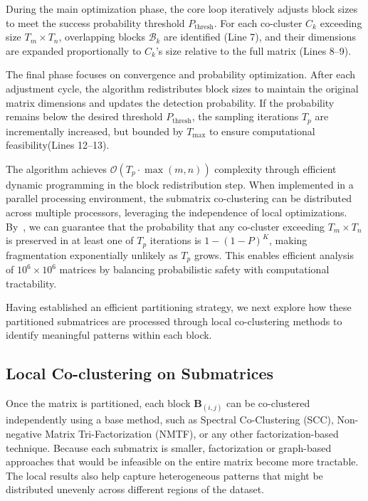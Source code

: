 \documentclass[journal]{IEEEtran}
\begin{document}
During the main optimization phase, the core loop iteratively adjusts block sizes to meet the success probability threshold $P_{\text{thresh}}$. For each co-cluster $C_k$ exceeding size $T_m \times T_n$, overlapping blocks $\mathcal{B}_k$ are identified (Line 7), and their dimensions are expanded proportionally to $C_k$'s size relative to the full matrix (Lines 8--9).

The final phase focuses on convergence and probability optimization. After each adjustment cycle, the algorithm redistributes block sizes to maintain the original matrix dimensions and updates the detection probability. If the probability remains below the desired threshold $P_{\text{thresh}}$, the sampling iterations $T_p$ are incrementally increased, but bounded by $T_{\text{max}}$ to ensure computational feasibility(Lines 12--13).


The algorithm achieves $\mathcal{O}(T_p \cdot \max(m,n))$ complexity through efficient dynamic programming in the block redistribution step. When implemented in a parallel processing environment, the submatrix co-clustering can be distributed across multiple processors, leveraging the independence of local optimizations.
By~, we can guarantee that the probability that any co-cluster exceeding $T_m \times T_n$ is preserved in at least one of $T_p$ iterations is $1 - (1 - P)^K$, making fragmentation exponentially unlikely as $T_p$ grows. This enables efficient analysis of $10^6 \times 10^6$ matrices by balancing probabilistic safety with computational tractability.

Having established an efficient partitioning strategy, we next explore how these partitioned submatrices are processed through local co-clustering methods to identify meaningful patterns within each block.


\subsection{Local Co-clustering on Submatrices}
\label{subsec:local-co-clustering}
Once the matrix is partitioned, each block $\mathbf{B}_{(i,j)}$ can be co-clustered independently using a base method, such as Spectral Co-Clustering (SCC), Non-negative Matrix Tri-Factorization (NMTF), or any other factorization-based technique. Because each submatrix is smaller, factorization or graph-based approaches that would be infeasible on the entire matrix become more tractable. The local results also help capture heterogeneous patterns that might be distributed unevenly across different regions of the dataset.
\end{document}
